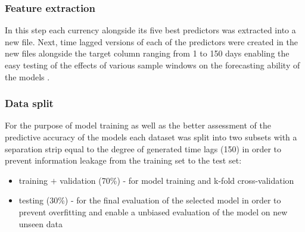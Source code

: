 \subsubsection{Feature extraction}\label{Feature extraction}

In this step each currency alongside its five best predictors was extracted into a new file. Next, time lagged versions of each of the predictors were created in the new files alongside the target column ranging from 1 to 150 days enabling the easy testing of the effects of various sample windows on the forecasting ability of the models \cite{rf-svr,gold}.

\subsubsection{Data split}\label{Data split}

For the purpose of model training as well as the better assessment of the predictive accuracy of the models each dataset was split into two subsets with a separation strip equal to the degree of generated time lags (150) in order to prevent information leakage from the training set to the test set:
\begin{itemize}
    \item training $+$ validation (70\%) - for model training and k-fold cross-validation
    \item testing (30\%) - for the final evaluation of the selected model in order to prevent overfitting and enable a unbiased evaluation of the model on new unseen data
\end{itemize}

